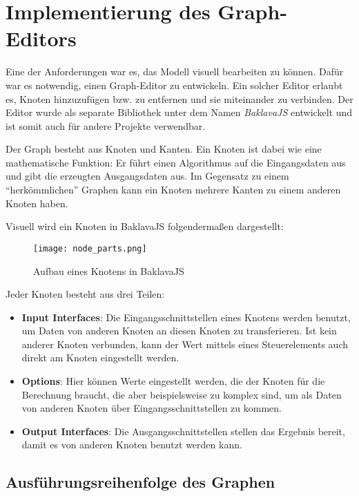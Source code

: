 
\chapter{Implementierung des Graph-Editors}
\label{sec:grapheditor}

Eine der Anforderungen war es, das Modell visuell bearbeiten zu können. Dafür war es notwendig, einen Graph-Editor zu entwickeln. Ein solcher Editor erlaubt es, Knoten hinzuzufügen bzw. zu entfernen und sie miteinander zu verbinden. Der Editor wurde als separate Bibliothek unter dem Namen \textit{BaklavaJS} entwickelt und ist somit auch für andere Projekte verwendbar.

Der Graph besteht aus Knoten und Kanten. Ein Knoten ist dabei wie eine mathematische Funktion: Er führt einen Algorithmus auf die Eingangsdaten aus und gibt die erzeugten Ausgangsdaten aus. Im Gegensatz zu einem \enquote{herkömmlichen} Graphen kann ein Knoten mehrere Kanten zu einem anderen Knoten haben.

Visuell wird ein Knoten in BaklavaJS folgendermaßen dargestellt:

\begin{figure}[H]
    \centering
    \texttt{[image: node\_parts.png]}
    \caption{Aufbau eines Knotens in BaklavaJS}
    \label{fig:nodeparts}
\end{figure}

Jeder Knoten besteht aus drei Teilen:
\begin{itemize}
    \item \textbf{Input Interfaces}: Die Eingangsschnittstellen eines Knotens werden benutzt, um Daten von anderen Knoten an diesen Knoten zu transferieren. Ist kein anderer Knoten verbunden, kann der Wert mittels eines Steuerelements auch direkt am Knoten eingestellt werden.
    \item \textbf{Options}: Hier können Werte eingestellt werden, die der Knoten für die Berechnung braucht, die aber beispielsweise zu komplex sind, um als Daten von anderen Knoten über Eingangsschnittstellen zu kommen.
    \item \textbf{Output Interfaces}: Die Ausgangsschnittstellen stellen das Ergebnis bereit, damit es von anderen Knoten benutzt werden kann.
\end{itemize}

\section{Ausführungsreihenfolge des Graphen}

